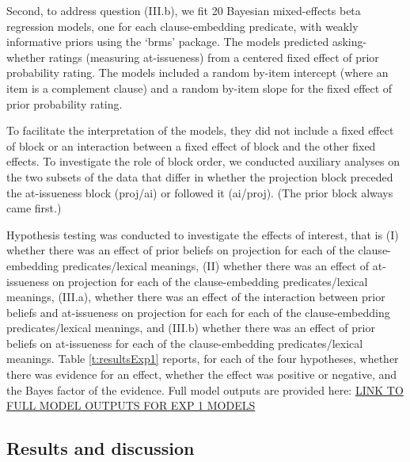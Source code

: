 \documentclass[11pt,fleqn]{article}
\newcommand{\6}{\mbox{$[\hspace*{-.6mm}[$}}
\newcommand{\9}{\mbox{$]\hspace*{-.6mm}]$}}
\begin{document}
Second, to address question (III.b), we fit 20 Bayesian mixed-effects beta regression models, one for each clause-embedding predicate, with weakly informative priors using the `brms' package. The models predicted asking-whether ratings (measuring at-issueness) from a centered fixed effect of prior probability rating. The models included a random by-item intercept (where an item is a complement clause) and a random by-item slope for the fixed effect of prior probability rating.

To facilitate the interpretation of the models, they did not include a fixed effect of block or an interaction between a fixed effect of block and the other fixed effects. To investigate the role of block order, we conducted auxiliary analyses on the two subsets of the data that differ in whether the projection block preceded the at-issueness block (proj/ai) or followed it (ai/proj). (The prior block always came first.) 

Hypothesis testing was conducted to investigate the effects of interest, that is (I) whether there was an effect of prior beliefs on projection for each of the clause-embedding predicates/lexical meanings, (II) whether there was an effect of at-issueness on projection for each of the clause-embedding predicates/lexical meanings, (III.a), whether there was an effect of the interaction between prior beliefs and at-issueness on projection for each  for each of the clause-embedding predicates/lexical meanings, and (III.b) whether there was an effect of prior beliefs on at-issueness for each of the clause-embedding predicates/lexical meanings. Table \ref{t:resultsExp1} reports, for each of the four hypotheses, whether there was evidence for an effect, whether the effect was positive or negative, and the Bayes factor of the evidence. Full model outputs are provided here: \url{LINK TO FULL MODEL OUTPUTS FOR EXP 1 MODELS}



\subsection{Results and discussion}\label{s-results-exp1}
\end{document}
